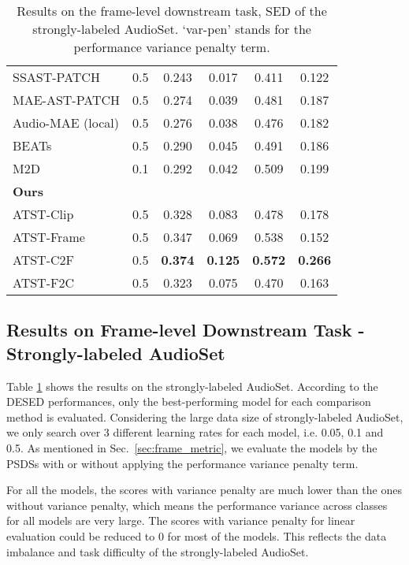 \begin{table}[tb]
{\begin{tabular}{l|c|cc|cc}
        SSAST-PATCH     \cite{gong_ssast_2022}       & 0.5 & 0.243 & 0.017 & 0.411 & 0.122 \\
        MAE-AST-PATCH   \cite{baade_mae-ast_2022}    & 0.5 & 0.274 & 0.039 & 0.481 & 0.187 \\
        Audio-MAE (local) \cite{huang_masked_2023}   & 0.5 & 0.276 & 0.038 & 0.476 & 0.182 \\
        BEATs \cite{chen_beats_2022}       & 0.5 & 0.290 & 0.045 & 0.491 & 0.186 \\
        M2D \cite{niizumi_masked_2023}               & 0.1 & 0.292 & 0.042 & 0.509 & 0.199 \\
        \midrule
        \multicolumn{6}{l}{\textbf{Ours}} \\
        ATST-Clip  & 0.5 & 0.328 & 0.083 & 0.478 & 0.178 \\
        ATST-Frame & 0.5 & 0.347 & 0.069 & 0.538 & 0.152 \\
        ATST-C2F   & 0.5 & \textbf{0.374} & \textbf{0.125} & \textbf{0.572} & \textbf{0.266} \\
        \textcolor{mygray}{ATST-F2C} & \textcolor{mygray}{0.5} & \textcolor{mygray}{0.323} & \textcolor{mygray}{0.075} & \textcolor{mygray}{0.470} & \textcolor{mygray}{0.163} \\
        \bottomrule
        \end{tabular}
    }
  \caption{Results on the frame-level downstream task, SED of the strongly-labeled AudioSet. `var-pen' stands for the performance variance penalty term.   } 
  \label{tab:audioset_strong}
\end{table}

\subsection{Results on Frame-level Downstream Task - Strongly-labeled AudioSet}
\label{sec:audioset_strong}

Table \ref{tab:audioset_strong} shows the results on the strongly-labeled AudioSet. According to the DESED performances, only the best-performing model for each comparison method is evaluated. 
Considering the large data size of strongly-labeled AudioSet, we only search over 3 different learning rates for each model, i.e. 0.05, 0.1 and 0.5. 
As mentioned in Sec.~\ref{sec:frame_metric}, we evaluate the models by the PSDSs with or without applying the performance variance penalty term. 

For all the models, the scores with variance penalty are much lower than the ones without variance penalty, which means the performance variance across classes for all models are very large. The scores with variance penalty for linear evaluation could be reduced to 0 for most of the models. This reflects the data imbalance and task difficulty of the strongly-labeled AudioSet. 


